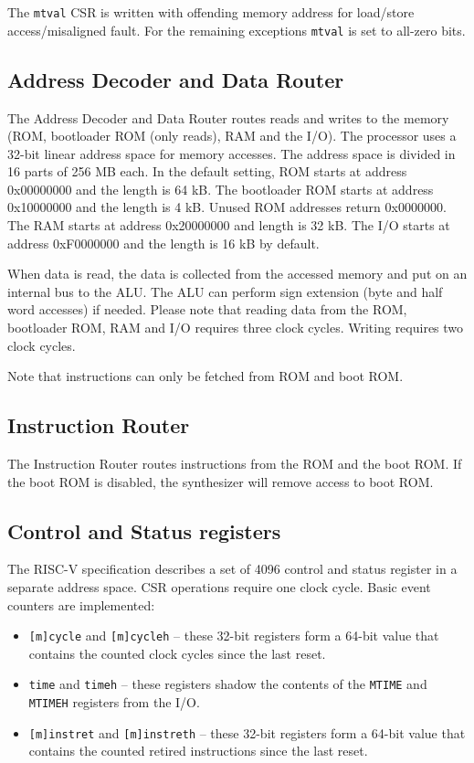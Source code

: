 \documentclass[12pt]{article}
\begin{document}
The \lstinline|mtval| CSR is written with offending memory address for load/store access/misaligned fault. For the remaining exceptions \lstinline|mtval| is set to all-zero bits.

\subsection{Address Decoder and Data Router}
\label{sec:addressdecoderanddatarouter}
The Address Decoder and Data Router routes reads and writes to the memory (ROM, bootloader ROM (only reads), RAM and the I/O). The processor uses a 32-bit linear address space for memory accesses. The address space is divided in 16 parts of 256 MB each. In the default setting, ROM starts at address 0x00000000 and the length is 64 kB. The bootloader ROM starts at address 0x10000000 and the length is 4 kB. Unused ROM addresses return 0x0000000. The RAM starts at address 0x20000000 and length is 32 kB. The I/O starts at address 0xF0000000 and the length is 16 kB by default.

When data is read, the data is collected from the accessed memory and put on an internal bus to the ALU. The ALU can perform sign extension (byte and half word accesses) if needed. Please note that reading data from the ROM, bootloader ROM, RAM and I/O requires three clock cycles. Writing requires two clock cycles.

Note that instructions can only be fetched from ROM and boot ROM.

\subsection{Instruction Router}
The Instruction Router routes instructions from the ROM and the boot ROM. If the boot ROM is disabled, the synthesizer will remove access to boot ROM.

\subsection{Control and Status registers}
The RISC-V specification describes a set of 4096 control and status register in a separate address space. CSR operations require one clock cycle. Basic event counters are implemented:

\begin{itemize}
\item \lstinline|[m]cycle| and \lstinline|[m]cycleh| -- these 32-bit registers form a 64-bit value that contains the counted clock cycles since the last reset.
\item \lstinline|time| and \lstinline|timeh| -- these registers shadow the contents of the \lstinline|MTIME| and \lstinline|MTIMEH| registers from the I/O.
\item \lstinline|[m]instret| and \lstinline|[m]instreth| -- these 32-bit registers form a 64-bit value that contains the counted retired instructions since the last reset.
\end{itemize}
\end{document}
